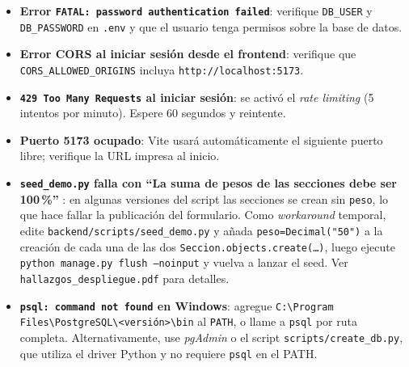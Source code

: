 \documentclass{computacion}
\begin{document}
\begin{itemize}
    \item \textbf{Error \texttt{FATAL: password authentication failed}}: verifique \texttt{DB\_USER} y \texttt{DB\_PASSWORD} en \texttt{.env} y que el usuario tenga permisos sobre la base de datos.
    \item \textbf{Error CORS al iniciar sesión desde el frontend}: verifique que \texttt{CORS\_ALLOWED\_ORIGINS} incluya \texttt{http://localhost:5173}.
    \item \textbf{\texttt{429 Too Many Requests} al iniciar sesión}: se activó el \emph{rate limiting} (5 intentos por minuto). Espere 60 segundos y reintente.
    \item \textbf{Puerto 5173 ocupado}: Vite usará automáticamente el siguiente puerto libre; verifique la URL impresa al inicio.
    \item \textbf{\texttt{seed\_demo.py} falla con ``La suma de pesos de las secciones debe ser 100\,\%'' }: en algunas versiones del script las secciones se crean sin \texttt{peso}, lo que hace fallar la publicación del formulario. Como \emph{workaround} temporal, edite \texttt{backend/scripts/seed\_demo.py} y añada \texttt{peso=Decimal("50")} a la creación de cada una de las dos \texttt{Seccion.objects.create(\ldots)}, luego ejecute \texttt{python manage.py flush --noinput} y vuelva a lanzar el seed. Ver \texttt{hallazgos\_despliegue.pdf} para detalles.
    \item \textbf{\texttt{psql: command not found} en Windows}: agregue \texttt{C:\textbackslash Program Files\textbackslash PostgreSQL\textbackslash<versión>\textbackslash bin} al \texttt{PATH}, o llame a \texttt{psql} por ruta completa. Alternativamente, use \emph{pgAdmin} o el script \texttt{scripts/create\_db.py}, que utiliza el driver Python y no requiere \texttt{psql} en el PATH.
\end{itemize}
\end{document}
